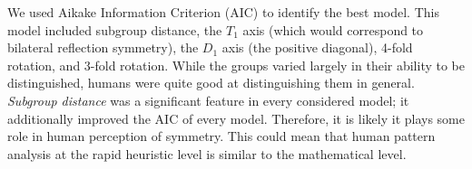 We used Aikake Information Criterion (AIC) to identify the best model. This model included subgroup distance, the $T_1$ axis (which would correspond to bilateral reflection symmetry), the $D_1$ axis (the positive diagonal), 4-fold rotation, and 3-fold rotation. While the groups varied largely in their ability to be distinguished, humans were quite good at distinguishing them in general. \textit{Subgroup distance} was a significant feature in every considered model; it additionally improved the AIC of every model. Therefore, it is likely it plays some role in human perception of symmetry. This could mean that human pattern analysis at the rapid heuristic level is similar to the mathematical level. 
